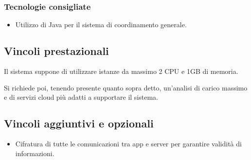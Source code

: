 \subsubsection{Tecnologie consigliate}

\begin{itemize}
    \item Utilizzo di Java per il sistema di coordinamento generale.
\end{itemize}

\subsection{Vincoli prestazionali}

Il sistema suppone di utilizzare istanze da massimo 2 CPU e 1GB di memoria.

Si richiede poi, tenendo presente quanto sopra detto, un'analisi di carico massimo e di servizi cloud più adatti a supportare il sistema.

\subsection{Vincoli aggiuntivi e opzionali}
\begin{itemize}
    \item Cifratura di tutte le comunicazioni tra app e server per garantire validità di informazioni.
\end{itemize}
